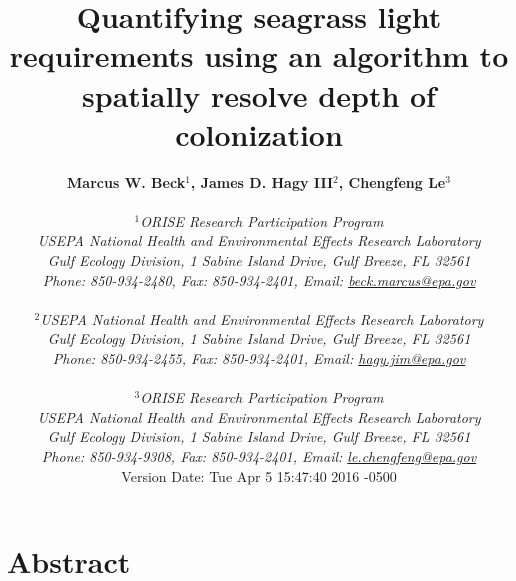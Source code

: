 \documentclass[letterpaper,12pt,oneside]{article}\usepackage[]{graphicx}\usepackage[]{color}
\begin{document}
\raggedbottom
\linenumbers
\raggedright
{}
\setlength{\parindent}{0.5in}
\renewcommand\refname{References \vspace{12pt}}

\begin{singlespace}
\title{{\bf {\Large Quantifying seagrass light requirements using an algorithm to spatially resolve depth of colonization}}}
\author{
  {\bf {\normalsize Marcus W. Beck$^1$, James D. Hagy III$^2$, Chengfeng Le$^3$}}
  \\\\{\textit {\normalsize $^1$ORISE Research Participation Program}}
  \\{\textit {\normalsize USEPA National Health and Environmental Effects Research Laboratory}}
  \\{\textit {\normalsize Gulf Ecology Division, 1 Sabine Island Drive, Gulf Breeze, FL 32561}}
	\\{\textit {\normalsize Phone: 850-934-2480, Fax: 850-934-2401, Email: \href{mailto:beck.marcus@epa.gov}{beck.marcus@epa.gov}}}
  \\\\{\textit {\normalsize $^2$USEPA National Health and Environmental Effects Research Laboratory}}
	\\{\textit {\normalsize Gulf Ecology Division, 1 Sabine Island Drive, Gulf Breeze, FL 32561}}
	\\{\textit {\normalsize Phone: 850-934-2455, Fax: 850-934-2401, Email: \href{mailto:hagy.jim@epa.gov}{hagy.jim@epa.gov}}}
  \\\\{\textit {\normalsize $^3$ORISE Research Participation Program}}
  \\{\textit {\normalsize USEPA National Health and Environmental Effects Research Laboratory}}
  \\{\textit {\normalsize Gulf Ecology Division, 1 Sabine Island Drive, Gulf Breeze, FL 32561}}
  \\{\textit {\normalsize Phone: 850-934-9308, Fax: 850-934-2401, Email: \href{mailto:le.chengfeng@epa.gov}{le.chengfeng@epa.gov}}}
  \vspace{1in} 
  \\ Version Date:   Tue Apr 5 15:47:40 2016 -0500
	}
\date{}
\maketitle
\end{singlespace}
\clearpage

\section*{Abstract}
\end{document}
